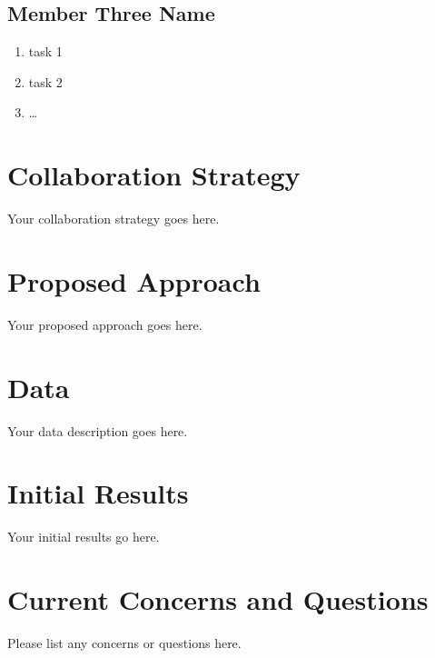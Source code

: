 \documentclass[10pt,twocolumn,letterpaper]{article}
\begin{document}
\subsection{Member Three Name}

\begin{enumerate}

  \item task 1
  \item task 2
  \item \ldots

\end{enumerate}

\section{Collaboration Strategy}

Your collaboration strategy goes here.

\section{Proposed Approach}

Your proposed approach goes here.

\section{Data}

Your data description goes here.

\section{Initial Results}

Your initial results go here.

\section{Current Concerns and Questions}

Please list any concerns or questions here.

  {\small
    
    
  }
\end{document}
